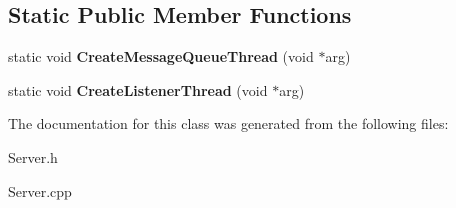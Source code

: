 \subsection*{Static Public Member Functions}
\begin{DoxyCompactItemize}
\item 
\hypertarget{class_server_a460b55499056f7572fc854a2fa0cf4a7}{}static void {\bfseries Create\+Message\+Queue\+Thread} (void $\ast$arg)\label{class_server_a460b55499056f7572fc854a2fa0cf4a7}

\item 
\hypertarget{class_server_a5941f455c15a223cda5ab5f69fa79cf2}{}static void {\bfseries Create\+Listener\+Thread} (void $\ast$arg)\label{class_server_a5941f455c15a223cda5ab5f69fa79cf2}

\end{DoxyCompactItemize}


The documentation for this class was generated from the following files\+:\begin{DoxyCompactItemize}
\item 
Server.\+h\item 
Server.\+cpp\end{DoxyCompactItemize}
